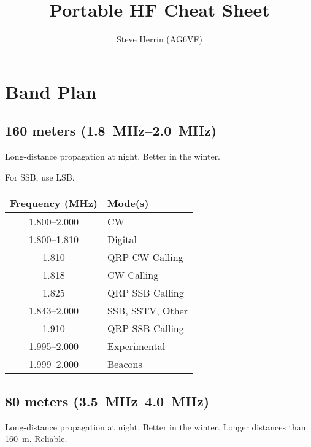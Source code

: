\documentclass[11pt, onecolumn, table]{article}
\begin{document}
\title{Portable HF Cheat Sheet}
\author{Steve Herrin (AG6VF)}
\date{}
\maketitle
\newpage



\section{Band Plan}


\subsection{160 meters (\SIrange{1.8}{2.0}{\MHz})}
Long-distance propagation at night. Better in the winter.

For SSB, use LSB.
\begin{center}
  \begin{tabular}{S l}
    {Frequency (\si{\MHz})}	& Mode(s)			\\
    \midrule
    \numrange{1.800}{2.000}	& CW				\\
    \numrange{1.800}{1.810}	& Digital			\\
    \num{1.810}				& QRP CW Calling	\\
    \num{1.818}				& CW Calling		\\
    \num{1.825}				& QRP SSB Calling	\\
    \numrange{1.843}{2.000}	& SSB, SSTV, Other	\\
    \num{1.910}				& QRP SSB Calling	\\
    \numrange{1.995}{2.000}	& Experimental		\\
    \numrange{1.999}{2.000}	& Beacons			\\
  \end{tabular}
\end{center}


\subsection{80 meters (\SIrange{3.5}{4.0}{\MHz})}
Long-distance propagation at night. Better in the winter.
Longer distances than \SI{160}{\m}. Reliable.
\end{document}
